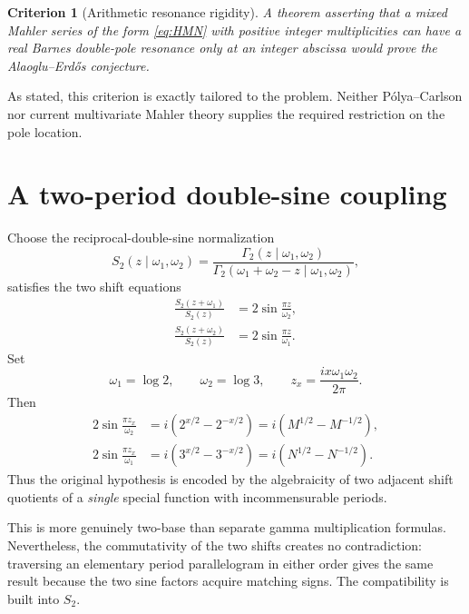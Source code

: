 \documentclass[11pt]{article}
\numberwithin{equation}{section}
\newtheorem{criterion}[theorem]{Criterion}
\theoremstyle{definition}
\theoremstyle{remark}
\begin{document}
\begin{criterion}[Arithmetic resonance rigidity]
\label{crit:resonance-rigidity}
A theorem asserting that a mixed Mahler series of the form \eqref{eq:HMN} with positive integer multiplicities can have a real Barnes double-pole resonance only at an integer abscissa would prove the Alaoglu--Erd\H{o}s conjecture.
\end{criterion}

As stated, this criterion is exactly tailored to the problem.  Neither P\'olya--Carlson nor current multivariate Mahler theory supplies the required restriction on the pole location.

\section{A two-period double-sine coupling}
\label{sec:double-sine}

Choose the reciprocal-double-sine normalization
\[
 S_2(z\mid\omega_1,\omega_2)
 =\frac{\Gamma_2(z\mid\omega_1,\omega_2)}
 {\Gamma_2(\omega_1+\omega_2-z\mid\omega_1,\omega_2)},
\]
satisfies the two shift equations
\begin{align}
 \frac{S_2(z+\omega_1)}{S_2(z)}&=2\sin\frac{\pi z}{\omega_2},\label{eq:S2shift1}\\
 \frac{S_2(z+\omega_2)}{S_2(z)}&=2\sin\frac{\pi z}{\omega_1}.
 \label{eq:S2shift2}
\end{align}
Set
\begin{equation}
 \omega_1=\log2,\qquad \omega_2=\log3,\qquad
 z_x=\frac{i x\omega_1\omega_2}{2\pi}.
 \label{eq:zx}
\end{equation}
Then
\begin{align}
 2\sin\frac{\pi z_x}{\omega_2}
 &=i\left(2^{x/2}-2^{-x/2}\right)
 =i\left(M^{1/2}-M^{-1/2}\right),\label{eq:S2M}\\
 2\sin\frac{\pi z_x}{\omega_1}
 &=i\left(3^{x/2}-3^{-x/2}\right)
 =i\left(N^{1/2}-N^{-1/2}\right).
 \label{eq:S2N}
\end{align}
Thus the original hypothesis is encoded by the algebraicity of two adjacent shift quotients of a \emph{single} special function with incommensurable periods.

This is more genuinely two-base than separate gamma multiplication formulas.  Nevertheless, the commutativity of the two shifts creates no contradiction: traversing an elementary period parallelogram in either order gives the same result because the two sine factors acquire matching signs.  The compatibility is built into $S_2$.
\end{document}
